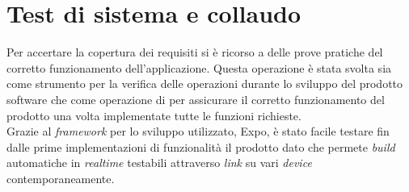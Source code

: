 \section{Test di sistema e collaudo}
Per accertare la copertura dei requisiti si è ricorso a delle prove pratiche del corretto funzionamento dell’applicazione. Questa operazione è stata svolta sia come strumento per la verifica delle operazioni durante lo sviluppo del prodotto software che come operazione di  per assicurare il corretto funzionamento del prodotto una volta implementate tutte le funzioni richieste. \\
Grazie al \emph{framework} per lo sviluppo utilizzato, Expo, è stato facile testare fin dalle prime implementazioni di funzionalità il prodotto dato che permete \emph{build} automatiche in \emph{realtime} testabili attraverso \emph{link} su vari \emph{device} contemporaneamente.
